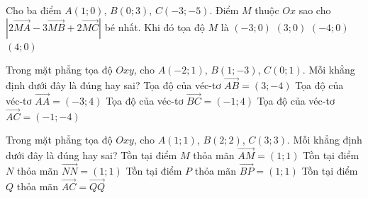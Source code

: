 \begin{ex}%
	Cho ba điểm $A(1;0)$, $B(0;3)$, $C(-3;-5)$. Điểm $M$ thuộc  $Ox$ sao cho $\left| 2\overrightarrow{MA}-3\overrightarrow{MB}+2\overrightarrow{MC}\right|$ bé nhất. Khi đó tọa độ $M$ là
	\choice 
		{$(-3;0)$} 
		 {$(3;0)$}
		 {\True $(-4;0)$}
		{$(4;0)$} 
\end{ex}


\begin{ex}%
	Trong mặt  phẳng tọa độ $Oxy$, cho $A(-2;1)$, $B(1;-3)$, $C(0;1)$. Mỗi khẳng định dưới
	 đây là đúng hay sai?
	\choiceTF 
		{\True Tọa  độ của véc-tơ $\overrightarrow{AB}=(3;-4)$}
		{Tọa độ  của véc-tơ $\overrightarrow{AA}=(-3;4)$}
		{\True  Tọa độ của véc-tơ $\overrightarrow{BC}=(-1;4)$}
		{Tọa  độ của véc-tơ $\overrightarrow{AC}=(-1;-4)$}
\end{ex}

\begin{ex}%
	Trong mặt phẳng tọa độ $Oxy$, cho $A(1;1)$, $B(2;2)$, $C(3;3)$.  Mỗi khẳng định dưới
	đây là đúng  hay sai?
	\choiceTF 
		{\True Tồn tại điểm $M$  thỏa mãn $\overrightarrow{AM}=(1;1)$}
		 {Tồn tại điểm $N$ thỏa mãn $\overrightarrow{NN}=(1;1)$}
		{\True Tồn tại  điểm $P$ thỏa mãn $\overrightarrow{BP}=(1;1)$}
		{Tồn tại điểm $Q$  thỏa mãn $\overrightarrow{AC}=\overrightarrow{QQ}$}
\end{ex}

